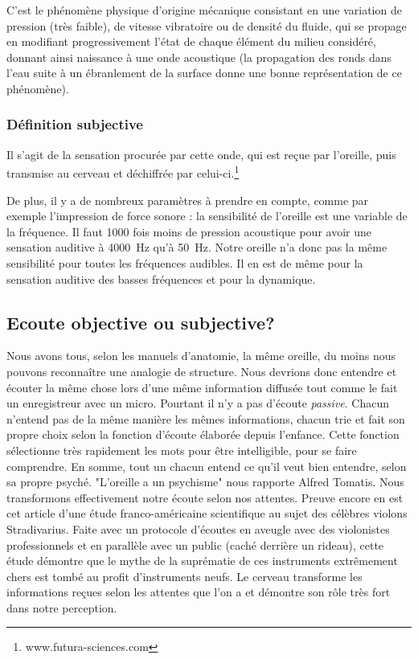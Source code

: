 C'est le phénomène phy\-si\-que
d'origine mécanique consistant en une variation de pression (très
faible), de vitesse vibratoire ou de densité du fluide, qui se propage
en modifiant progressivement l'état de chaque élément du milieu considéré,
donnant ainsi naissance à une onde acoustique (la propagation des
ronds dans l'eau suite à un ébranlement de la surface donne une bonne
représentation de ce phénomène). 

\subsubsection{Définition subjective}	

	Il s'agit de la sensation procurée
	par cette onde, qui est reçue par l'oreille, puis transmise au cerveau
	et déchiffrée par celui-ci.\footnote{www.futura-sciences.com } 

De plus, il y a de nombreux paramètres à prendre en compte, comme par
exemple l'impression de force sonore : la sensibilité de l'oreille
est une variable de la fréquence. Il faut 1000 fois moins de pression
acoustique pour avoir une sensation auditive à \SI{4000}{\hertz} qu'à \SI{50}{\hertz}.
Notre oreille n'a donc pas la même sensibilité pour toutes
les fréquences audibles. Il en est de même pour la sensation auditive
des basses fréquences et pour la dynamique. 

\subsection{Ecoute objective ou subjective?}

Nous avons tous,
selon les manuels d'anatomie, la même
oreille, du moins nous pouvons reconnaître une analogie de structure. Nous devrions donc entendre et écouter la même chose
lors d'une même information diffusée tout comme le fait un enregistreur avec un micro. Pourtant il n'y a pas d'écoute \emph{passive}. Chacun n'entend pas de la même manière les mêmes
informations, chacun trie et fait son propre choix selon la fonction
d'écoute élaborée depuis l'enfance. Cette fonction sélectionne très
rapidement les mots pour être intelligible, pour se faire comprendre. En somme, tout un chacun entend ce qu'il veut bien
entendre, selon sa propre psyché. 
"L'oreille a un psychisme" nous rapporte Alfred Tomatis.
Nous transformons effectivement notre écoute selon nos attentes. Preuve encore en est cet 
article d'une 
étude franco-américaine scientifique
\autocite{fritz_stradivarius} au sujet des célèbres violons Stradivarius. Faite avec un protocole 
d'écoutes en aveugle avec
des violonistes professionnels et en parallèle avec un public (caché
derrière un rideau), cette étude démontre que le mythe de la suprématie
de ces instruments extrêmement chers est tombé au profit d'instruments
neufs. Le cerveau transforme les informations reçues
selon les attentes que l'on a et démontre son rôle très fort dans 
notre perception.

